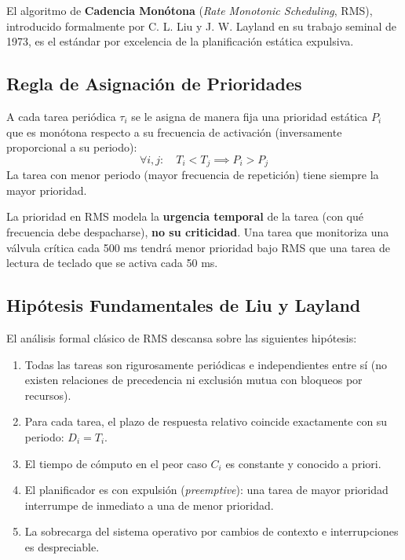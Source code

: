 El algoritmo de \textbf{Cadencia Monótona} (\textit{Rate Monotonic Scheduling}, RMS), introducido formalmente por C. L. Liu y J. W. Layland en su trabajo seminal de 1973, es el estándar por excelencia de la planificación estática expulsiva.

\subsection{Regla de Asignación de Prioridades}
\begin{definicion}
A cada tarea periódica $\tau_i$ se le asigna de manera fija una prioridad estática $P_i$ que es monótona respecto a su frecuencia de activación (inversamente proporcional a su periodo):
\begin{equation}
\forall i, j: \quad T_i < T_j \implies P_i > P_j
\end{equation}
La tarea con menor periodo (mayor frecuencia de repetición) tiene siempre la mayor prioridad.
\end{definicion}

\begin{aviso}
La prioridad en RMS modela la \textbf{urgencia temporal} de la tarea (con qué frecuencia debe despacharse), \textbf{no su criticidad}. Una tarea que monitoriza una válvula crítica cada 500 ms tendrá menor prioridad bajo RMS que una tarea de lectura de teclado que se activa cada 50 ms.
\end{aviso}

\subsection{Hipótesis Fundamentales de Liu y Layland}
El análisis formal clásico de RMS descansa sobre las siguientes hipótesis:
\begin{enumerate}[leftmargin=*]
    \item Todas las tareas son rigurosamente periódicas e independientes entre sí (no existen relaciones de precedencia ni exclusión mutua con bloqueos por recursos).
    \item Para cada tarea, el plazo de respuesta relativo coincide exactamente con su periodo: $D_i = T_i$.
    \item El tiempo de cómputo en el peor caso $C_i$ es constante y conocido a priori.
    \item El planificador es con expulsión (\textit{preemptive}): una tarea de mayor prioridad interrumpe de inmediato a una de menor prioridad.
    \item La sobrecarga del sistema operativo por cambios de contexto e interrupciones es despreciable.
\end{enumerate}

